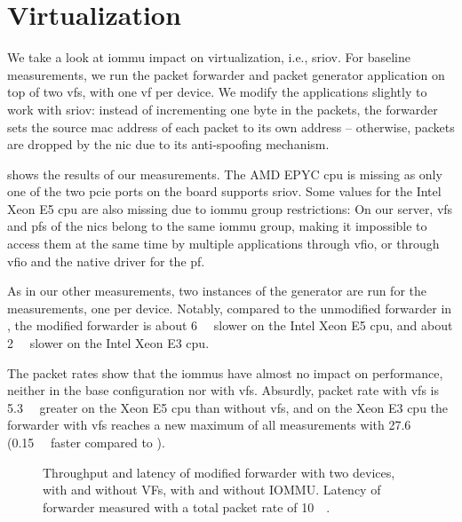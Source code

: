 \section{Virtualization}
\label{sec:virtualization}

We take a look at \ac{iommu} impact on virtualization, i.e., \ac{sriov}. For
baseline measurements, we run the packet forwarder and packet generator
application on top of two \acp{vf}, with one \ac{vf} per device. We modify the
applications slightly to work with \ac{sriov}: instead of incrementing one byte
in the packets, the forwarder sets the source \ac{mac} address of each packet to
its own address -- otherwise, packets are dropped by the \ac{nic} due to its
anti-spoofing mechanism.

 shows the results of our measurements. The AMD EPYC
\ac{cpu} is missing as only one of the two \ac{pcie} ports on the board supports
\ac{sriov}. Some values for the Intel Xeon E5 \ac{cpu} are also missing due to
\ac{iommu} group restrictions: On our server, \acp{vf} and \acp{pf} of the
\acp{nic} belong to the same \ac{iommu} group, making it impossible to access
them at the same time by multiple applications through \ac{vfio}, or through
\ac{vfio} and the native driver for the \ac{pf}.

As in our other measurements, two instances of the generator are run for the
measurements, one per device. Notably, compared to the unmodified forwarder in
, the modified forwarder is about
\SI{6}{\mega\pps} slower on the Intel Xeon E5 \ac{cpu}, and about
\SI{2}{\mega\pps} slower on the Intel Xeon E3 \ac{cpu}.

The packet rates show that the \acp{iommu} have almost no impact on performance,
neither in the base configuration nor with \acp{vf}. Absurdly, packet rate with
\acp{vf} is \SI{5.3}{\mega\pps} greater on the Xeon E5 \ac{cpu} than without
\acp{vf}, and on the Xeon E3 \ac{cpu} the forwarder with \acp{vf} reaches a new
maximum of all measurements with \SI{27.6}{\mega\pps} (\SI{0.15}{\mega\pps}
faster compared to ).

\begin{figure}%
	\centering
    \par

    \caption{Throughput and latency of modified forwarder with two devices, with
    and without VFs, with and without IOMMU. Latency of forwarder measured with
    a total packet rate of \SI{10}{\mega\pps}.}
	\label{fig:sriov-baseline}
\end{figure}

